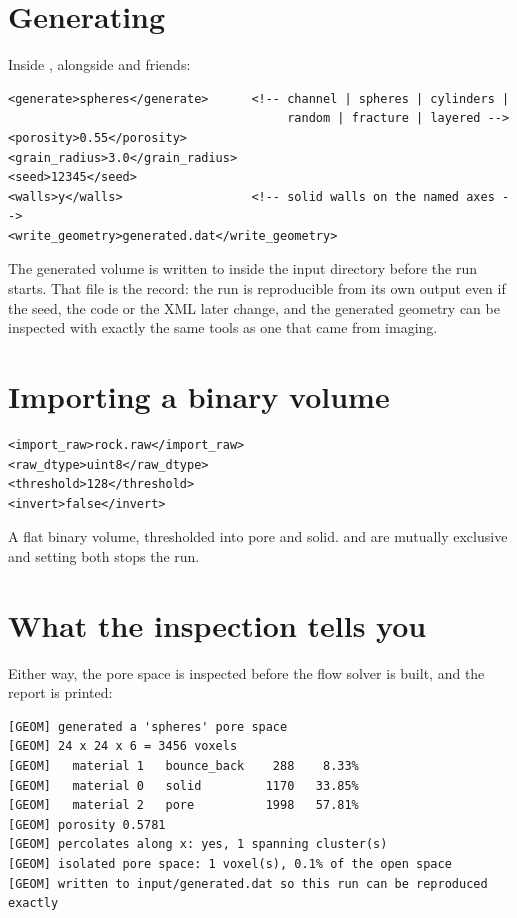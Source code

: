 \section{Generating}

Inside , alongside  and friends:

\begin{lstlisting}[style=xml]
<generate>spheres</generate>      <!-- channel | spheres | cylinders |
                                       random | fracture | layered -->
<porosity>0.55</porosity>
<grain_radius>3.0</grain_radius>
<seed>12345</seed>
<walls>y</walls>                  <!-- solid walls on the named axes -->
<write_geometry>generated.dat</write_geometry>
\end{lstlisting}

The generated volume is written to  inside the input
directory before the run starts. That file is the record: the run is
reproducible from its own output even if the seed, the code or the XML later
change, and the generated geometry can be inspected with exactly the same
tools as one that came from imaging.

\section{Importing a binary volume}

\begin{lstlisting}[style=xml]
<import_raw>rock.raw</import_raw>
<raw_dtype>uint8</raw_dtype>
<threshold>128</threshold>
<invert>false</invert>
\end{lstlisting}

A flat binary volume, thresholded into pore and solid.  and
 are mutually exclusive and setting both stops the run.

\section{What the inspection tells you}

Either way, the pore space is inspected before the flow solver is built, and
the report is printed:

\begin{lstlisting}[style=sh]
[GEOM] generated a 'spheres' pore space
[GEOM] 24 x 24 x 6 = 3456 voxels
[GEOM]   material 1   bounce_back    288    8.33%
[GEOM]   material 0   solid         1170   33.85%
[GEOM]   material 2   pore          1998   57.81%
[GEOM] porosity 0.5781
[GEOM] percolates along x: yes, 1 spanning cluster(s)
[GEOM] isolated pore space: 1 voxel(s), 0.1% of the open space
[GEOM] written to input/generated.dat so this run can be reproduced exactly
\end{lstlisting}

